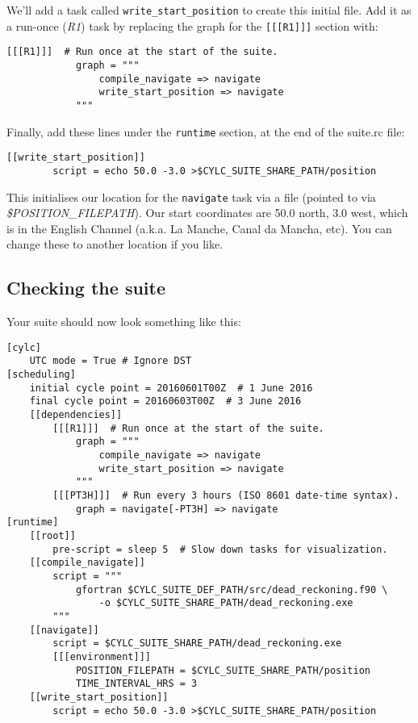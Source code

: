 We'll add a task called \lstinline{write_start_position} to create this initial file. Add it as a run-once ({\em R1}) task by replacing the graph for the \lstinline{[[[R1]]]} section with:

\lstset{language=suiterc}
\begin{lstlisting}[columns=fullflexible]
        [[[R1]]]  # Run once at the start of the suite.
            graph = """
                compile_navigate => navigate
                write_start_position => navigate
            """
\end{lstlisting}

Finally, add these lines under the \lstinline{runtime} section, at the end of the suite.rc file:

\lstset{language=suiterc}
\begin{lstlisting}[columns=fullflexible]
    [[write_start_position]]
        script = echo 50.0 -3.0 >$CYLC_SUITE_SHARE_PATH/position
\end{lstlisting}

This initialises our location for the \lstinline{navigate} task via a file (pointed to via {\em \$POSITION\_FILEPATH}). Our start coordinates are 50.0 north, 3.0 west, which is in the English Channel (a.k.a. La Manche, Canal da Mancha, etc). You can change these to another location if you like.

\subsection{Checking the suite}

Your suite should now look something like this:

\lstset{language=suiterc}
\begin{lstlisting}[columns=fullflexible]
[cylc]
    UTC mode = True # Ignore DST
[scheduling]
    initial cycle point = 20160601T00Z  # 1 June 2016
    final cycle point = 20160603T00Z  # 3 June 2016
    [[dependencies]]
        [[[R1]]]  # Run once at the start of the suite.
            graph = """
                compile_navigate => navigate
                write_start_position => navigate
            """
        [[[PT3H]]]  # Run every 3 hours (ISO 8601 date-time syntax).
            graph = navigate[-PT3H] => navigate
[runtime]
    [[root]]
        pre-script = sleep 5  # Slow down tasks for visualization.
    [[compile_navigate]]
        script = """
            gfortran $CYLC_SUITE_DEF_PATH/src/dead_reckoning.f90 \
                -o $CYLC_SUITE_SHARE_PATH/dead_reckoning.exe
        """
    [[navigate]]
        script = $CYLC_SUITE_SHARE_PATH/dead_reckoning.exe
        [[[environment]]]
            POSITION_FILEPATH = $CYLC_SUITE_SHARE_PATH/position
            TIME_INTERVAL_HRS = 3
    [[write_start_position]]
        script = echo 50.0 -3.0 >$CYLC_SUITE_SHARE_PATH/position
\end{lstlisting}

